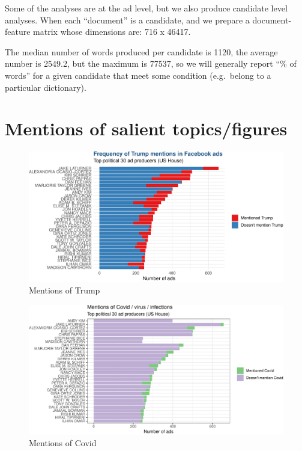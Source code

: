 \documentclass[
  12pt,
]{article}
\begin{document}
Some of the analyses are at the ad level, but we also produce candidate level analyses.
When each ``document'' is a candidate, and we prepare a document-feature matrix whose dimensions are: 716 x 46417.

The median number of words produced per candidate is 1120, the average number is 2549.2, but the maximum is 77537, so we will generally report ``\% of words'' for a given candidate that meet some condition (e.g.~belong to a particular dictionary).

\hypertarget{mentions-of-salient-topicsfigures}{%
\section{Mentions of salient topics/figures}\label{mentions-of-salient-topicsfigures}}

\begin{figure}
\centering
\includegraphics{figsFB/top30-trump-1.pdf}
\caption{\label{fig:top30-trump}Mentions of Trump}
\end{figure}

\begin{figure}
\centering
\includegraphics{figsFB/top30-covid-1.pdf}
\caption{\label{fig:top30-covid}Mentions of Covid}
\end{figure}
\end{document}
